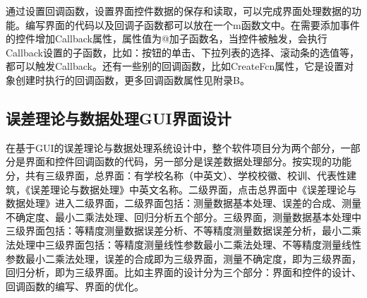 通过设置回调函数，设置界面控件数据的保存和读取，可以完成界面处理数据的功能。编写界面的代码以及回调子函数都可以放在一个m函数文中。在需要添加事件的控件增加Callback属性，属性值为@加子函数名，当控件被触发，会执行Callback设置的子函数，比如：按钮的单击、下拉列表的选择、滚动条的选值等，都可以触发Callback。还有一些别的回调函数，比如CreateFcn属性，它是设置对象创建时执行的回调函数，更多回调函数属性见附录B。

\subsection{误差理论与数据处理GUI界面设计}
在基于GUI的误差理论与数据处理系统设计中，整个软件项目分为两个部分，一部分是界面和控件回调函数的代码，另一部分是误差数据处理部分。按实现的功能分，共有三级界面，总界面：有学校名称（中英文）、学校校徽、校训、代表性建筑，《误差理论与数据处理》中英文名称。二级界面，点击总界面中《误差理论与数据处理》进入二级界面，二级界面包括：测量数据基本处理、误差的合成、测量不确定度、最小二乘法处理、回归分析五个部分。三级界面，测量数据基本处理中三级界面包括：等精度测量数据误差分析、不等精度测量数据误差分析，最小二乘法处理中三级界面包括：等精度测量线性参数最小二乘法处理、不等精度测量线性参数最小二乘法处理，误差的合成即为三级界面，测量不确定度，即为三级界面，回归分析，即为三级界面。比如主界面的设计分为三个部分：界面和控件的设计、回调函数的编写、界面的优化。
\newpage

